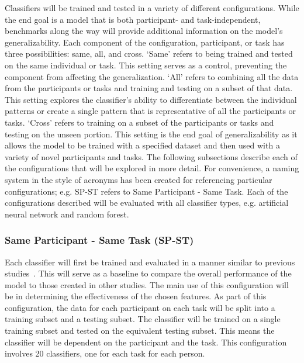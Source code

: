 \documentclass[11pt]{article}
\begin{document}
Classifiers will be trained and tested in a variety of different configurations. While the end goal is a model that is both participant- and task-independent, benchmarks along the way will provide additional information on the model's generalizability. Each component of the configuration, participant, or task has three possibilities: same, all, and cross. `Same' refers to being trained and tested on the same individual or task. This setting serves as a control, preventing the component from affecting the generalization. `All' refers to combining all the data from the participants or tasks and training and testing on a subset of that data. This setting explores the classifier's ability to differentiate between the individual patterns or create a single pattern that is representative of all the participants or tasks. `Cross' refers to training on a subset of the participants or tasks and testing on the unseen portion. This setting is the end goal of generalizability as it allows the model to be trained with a specified dataset and then used with a variety of novel participants and tasks. The following subsections describe each of the configurations that will be explored in more detail. For convenience, a naming system in the style of acronyms has been created for referencing particular configurations; e.g. SP-ST refers to Same Participant - Same Task. Each of the configurations described will be evaluated with all classifier types, e.g. artificial neural network and random forest.

\subsubsection{Same Participant - Same Task (SP-ST)}
Each classifier will first be trained and evaluated in a manner similar to previous studies~\cite{Wilson, Zhang, Wang_R, Yin}. This will serve as a baseline to compare the overall performance of the model to those created in other studies. The main use of this configuration will be in determining the effectiveness of the chosen features. As part of this configuration, the data for each participant on each task will be split into a training subset and a testing subset. The classifier will be trained on a single training subset and tested on the equivalent testing subset. This means the classifier will be dependent on the participant and the task. This configuration involves 20 classifiers, one for each task for each person.
\end{document}
